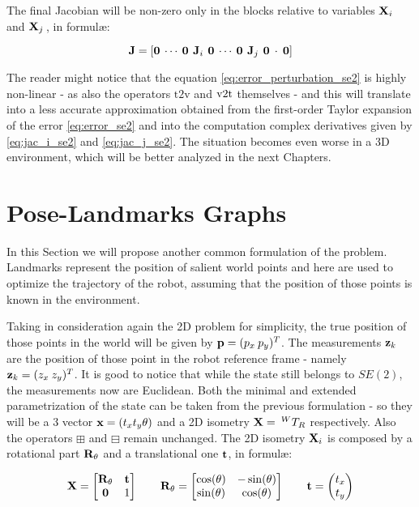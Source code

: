 \noindent The final Jacobian will be non-zero only in the blocks relative to variables $\mathbf{X}_i$ and $\mathbf{X}_j\,$, in formul\ae:

\begin{equation}
    \mathbf{J} = \left[\mathbf{0} \: \cdots \: \mathbf{0} \:\, \mathbf{J}_i \,\: \mathbf{0} \: \cdots \: \mathbf{0} \:\, \mathbf{J}_j \,\: \mathbf{0} \: \cdot \: \mathbf{0}\right]
    \label{eq:jac_se2}
\end{equation}

The reader might notice that the equation \ref{eq:error_perturbation_se2} is highly non-linear - as also the operators $\text{t2v}$ and $\v2t$ themselves - and this will translate into a less accurate approximation obtained from the first-order Taylor expansion of the error \ref{eq:error_se2} and into the computation complex derivatives given by \ref{eq:jac_i_se2} and \ref{eq:jac_j_se2}. The situation becomes even worse in a 3D environment, which will be better analyzed in the next Chapters. 

\section{Pose-Landmarks Graphs}\label{sec:pose_land_graph}
In this Section we will propose another common formulation of the problem. Landmarks represent the position of salient world points and here are used to optimize the trajectory of the robot, assuming that the position of those points is known in the environment. 

Taking in consideration again the 2D problem for simplicity, the true position of those points in the world will be given by $\mathbf{p} = (p_x\: p_y)^T$. The measurements $\mathbf{z}_k$ are the position of those point in the robot reference frame - namely $\mathbf{z}_k = (z_x\:z_y)^T$. It is good to notice that while the state still belongs to $SE(2)$, the measurements now are Euclidean. Both the minimal and extended parametrization of the state can be taken from the previous formulation - so they will be a $3$ vector $\mathbf{x} = (t_x t_y \theta)$ and a 2D isometry $\mathbf{X} =\: ^{W}T_{R}$ respectively. Also the operators $\boxplus$ and $\boxminus$ remain unchanged. The 2D isometry $\mathbf{X}_i$ is composed by a rotational part $\mathbf{R}_{\theta}$ and a translational one $\mathbf{t}$, in formul\ae:

\begin{align}
    \mathbf{X} = 
        \begin{bmatrix}
            \mathbf{R}_{\theta} & \mathbf{t} \\
            \mathbf{0} & 1
        \end{bmatrix} 
    \qquad
    \mathbf{R}_{\theta} = 
        \begin{bmatrix}
            \cos(\theta) & -\sin(\theta) \\
            \sin(\theta) & \cos(\theta)
        \end{bmatrix}
    \qquad
    \mathbf{t} = 
        \begin{pmatrix}
            t_x \\
            t_y
        \end{pmatrix}
    \label{eq:2d_isometry}
\end{align}

